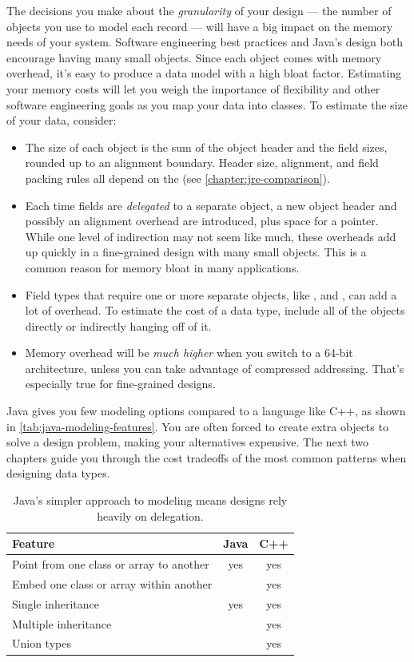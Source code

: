 The decisions you make about the \emph{granularity} of your design --- the
number of objects you use to model each record --- will have a big impact on
the memory needs of your system. 
Software engineering best practices and Java's design
both encourage having many small objects.
Since each object comes with memory overhead, it's easy to
produce a data model with a high bloat factor. Estimating your
memory costs will let you weigh the importance of
flexibility and other software engineering goals as you map your data into classes. To estimate the size of
your data, consider:
\begin{itemize}
  \item  The size of each object is the sum of the object header and the field
  sizes, rounded up to an alignment boundary. Header size, alignment, and field
  packing rules all depend on the \jre (see \autoref{chapter:jre-comparison}).
  \item Each time fields are \emph{delegated} to a separate object,
  a new object header and possibly an alignment overhead are introduced, plus
  space for a pointer. While one level of indirection may not seem like much,
  these overheads add up quickly in a fine-grained
  design with many small objects. This is a common reason for memory bloat in
  many applications.
  \item Field types that require one or more separate objects, like
  ,  and , can add a lot of
  overhead.
  To estimate the cost of a data type, include all of the objects directly
  or indirectly hanging off of it.
  \item Memory overhead will be \emph{much higher} when you switch to a 64-bit
  architecture, unless you can take advantage of compressed addressing. 
  That's especially true for fine-grained designs.
\end{itemize}

Java gives you few modeling options compared to a language
like C++, as shown in \autoref{tab:java-modeling-features}. You are often forced to create
extra objects to solve a design problem, making your alternatives expensive.
The next two chapters guide you through the cost tradeoffs of the most common
patterns when designing data types.

\begin{table}[h]
  \centering
\begin{tabular}{lcc} \toprule
	Feature & Java & C++ \\ \midrule
	Point from one class or array to another & yes & yes \\
	Embed one class or array within another & & yes \\
	Single inheritance & yes & yes \\
	Multiple inheritance &  & yes \\
	Union types & & yes \\
	\bottomrule
\end{tabular}
  \caption{Java's simpler approach to modeling means designs rely heavily on
  delegation.}
  \label{tab:java-modeling-features}
\end{table}


